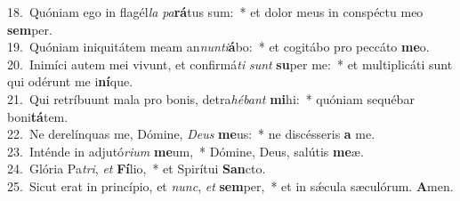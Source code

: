 {18.~}Quóniam ego in flagél\textit{la} \textit{pa}\textbf{rá}tus sum:~* et dolor meus in conspéctu meo \textbf{sem}per.\\
{19.~}Quóniam iniquitátem meam an\textit{nun}\textit{ti}\textbf{á}bo:~* et cogitábo pro peccáto \textbf{me}o.\\
{20.~}Inimíci autem mei vivunt, et confirmá\textit{ti} \textit{sunt} \textbf{su}per me:~* et multiplicáti sunt qui odérunt me i\textbf{ní}que.\\
{21.~}Qui retríbuunt mala pro bonis, detra\textit{hé}\textit{bant} \textbf{mi}hi:~* quóniam sequébar boni\textbf{tá}tem.\\
{22.~}Ne derelínquas me, Dómine, \textit{De}\textit{us} \textbf{me}us:~* ne discésseris \textbf{a} me.\\
{23.~}Inténde in adjutó\textit{ri}\textit{um} \textbf{me}um,~* Dómine, Deus, salútis \textbf{me}æ.\\
{24.~}Glória Pa\textit{tri}, \textit{et} \textbf{Fí}lio,~* et Spirítui \textbf{San}cto.\\
{25.~}Sicut erat in princípio, et \textit{nunc}, \textit{et} \textbf{sem}per,~* et in sǽcula sæculórum. \textbf{A}men.\\
